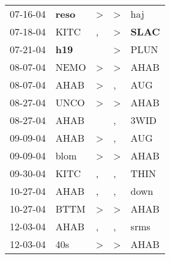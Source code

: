 \begin{supertabular}{p{0.07\textwidth}p{0.06\textwidth}p{0.02\textwidth}p{0.02\textwidth}p{0.06\textwidth}}
          07-16-04\textsuperscript{} &  \textbf{reso\textsuperscript{}} &  \textgreater &     \textgreater &            haj\textsuperscript{} \\
          07-18-04\textsuperscript{} &           KITC\textsuperscript{} &             , &     \textgreater &  \textbf{SLAC\textsuperscript{}} \\
          07-21-04\textsuperscript{} &   \textbf{h19\textsuperscript{}} &               &     \textgreater &           PLUN\textsuperscript{} \\
          08-07-04\textsuperscript{} &           NEMO\textsuperscript{} &  \textgreater &     \textgreater &           AHAB\textsuperscript{} \\
          08-07-04\textsuperscript{} &           AHAB\textsuperscript{} &  \textgreater &                , &            AUG\textsuperscript{} \\
          08-27-04\textsuperscript{} &           UNCO\textsuperscript{} &  \textgreater &     \textgreater &           AHAB\textsuperscript{} \\
          08-27-04\textsuperscript{} &           AHAB\textsuperscript{} &               &                , &           3WID\textsuperscript{} \\
          09-09-04\textsuperscript{} &           AHAB\textsuperscript{} &  \textgreater &                , &            AUG\textsuperscript{} \\
          09-09-04\textsuperscript{} &           blom\textsuperscript{} &  \textgreater &     \textgreater &           AHAB\textsuperscript{} \\
          09-30-04\textsuperscript{} &           KITC\textsuperscript{} &             , &                , &           THIN\textsuperscript{} \\
          10-27-04\textsuperscript{} &           AHAB\textsuperscript{} &             , &                , &           down\textsuperscript{} \\
          10-27-04\textsuperscript{} &           BTTM\textsuperscript{} &  \textgreater &     \textgreater &           AHAB\textsuperscript{} \\
          12-03-04\textsuperscript{} &           AHAB\textsuperscript{} &             , &                , &           srms\textsuperscript{} \\
          12-03-04\textsuperscript{} &            40s\textsuperscript{} &  \textgreater &     \textgreater &           AHAB\textsuperscript{} \\

\end{supertabular}
